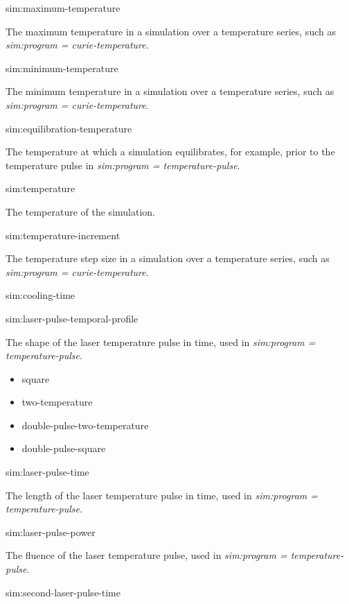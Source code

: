 {\zicf sim:maximum-temperature} The maximum temperature in a simulation over a temperature series, such as \textit{sim:program = curie-temperature}.

{\zicf sim:minimum-temperature} The minimum temperature in a simulation over a temperature series, such as \textit{sim:program = curie-temperature}.

{\zicf sim:equilibration-temperature} The temperature at which a simulation equilibrates, for example, prior to the temperature pulse in \textit{sim:program = temperature-pulse}.

{\zicf sim:temperature} The temperature of the simulation.

{\zicf sim:temperature-increment} The temperature step size in a simulation over a temperature series, such as \textit{sim:program = curie-temperature}.

{\zicf sim:cooling-time}

{\zicf sim:laser-pulse-temporal-profile} The shape of the laser temperature pulse in time, used in \textit{sim:program = temperature-pulse}.

\begin{itemize}
   \item[] square
   \item[] two-temperature
   \item[] double-pulse-two-temperature
   \item[] double-pulse-square
\end{itemize}

{\zicf sim:laser-pulse-time} The length of the laser temperature pulse in time, used in \textit{sim:program = temperature-pulse}.

{\zicf sim:laser-pulse-power} The fluence of the laser temperature pulse, used in \textit{sim:program = temperature-pulse}.

{\zicf sim:second-laser-pulse-time}

